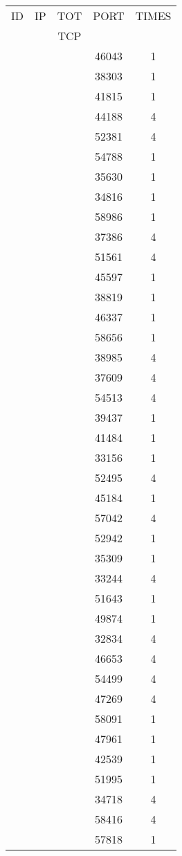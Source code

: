\documentclass[a4paper]{scrartcl}
\begin{document}
\begin{minipage}[b]{0.5\linewidth}
\begin{tabular}{| c | c | c | c | c |}
\hline
ID & IP & TOT & PORT & TIMES \\ 
   &    & TCP &      &       \\ 
\hline
& & & 46043 & 1 \\ & & & 38303 & 1 \\ & & & 41815 & 1 \\ & & & 44188 & 4 \\ & & & 52381 & 4 \\ & & & 54788 & 1 \\ & & & 35630 & 1 \\ & & & 34816 & 1 \\ & & & 58986 & 1 \\ & & & 37386 & 4 \\ & & & 51561 & 4 \\ & & & 45597 & 1 \\ & & & 38819 & 1 \\ & & & 46337 & 1 \\ & & & 58656 & 1 \\ & & & 38985 & 4 \\ & & & 37609 & 4 \\ & & & 54513 & 4 \\ & & & 39437 & 1 \\ & & & 41484 & 1 \\ & & & 33156 & 1 \\ & & & 52495 & 4 \\ & & & 45184 & 1 \\ & & & 57042 & 4 \\ & & & 52942 & 1 \\ & & & 35309 & 1 \\ & & & 33244 & 4 \\ & & & 51643 & 1 \\ & & & 49874 & 1 \\ & & & 32834 & 4 \\ & & & 46653 & 4 \\ & & & 54499 & 4 \\ & & & 47269 & 4 \\ & & & 58091 & 1 \\ & & & 47961 & 1 \\ & & & 42539 & 1 \\ & & & 51995 & 1 \\ & & & 34718 & 4 \\ & & & 58416 & 4 \\ & & & 57818 & 1 \\ \hline\end{tabular}\end{minipage} \hfill\begin{minipage}[b]{0.5\linewidth}\begin{tabular}{| c | c | c | c | c |}

\end{tabular}
\end{minipage}
\end{document}
